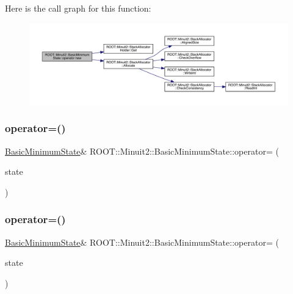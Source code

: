 Here is the call graph for this function\+:
\nopagebreak
\begin{figure}[H]
\begin{center}
\leavevmode
\includegraphics[width=350pt]{d0/db1/classROOT_1_1Minuit2_1_1BasicMinimumState_ad0e5ab496757c5bee3544485a49fe7aa_cgraph}
\end{center}
\end{figure}
\mbox{\label{classROOT_1_1Minuit2_1_1BasicMinimumState_a68cf1c28f5f728fa62a0c39ff943a2bf}} 
\subsubsection{\texorpdfstring{operator=()}{operator=()}\hspace{0.1cm}{\footnotesize\ttfamily [1/3]}}
{\footnotesize\ttfamily \mbox{\hyperlink{classROOT_1_1Minuit2_1_1BasicMinimumState}{Basic\+Minimum\+State}}\& R\+O\+O\+T\+::\+Minuit2\+::\+Basic\+Minimum\+State\+::operator= (\begin{DoxyParamCaption}\item[{const \mbox{\hyperlink{classROOT_1_1Minuit2_1_1BasicMinimumState}{Basic\+Minimum\+State}} \&}]{state }\end{DoxyParamCaption})\hspace{0.3cm}{\ttfamily [inline]}}

\mbox{\label{classROOT_1_1Minuit2_1_1BasicMinimumState_a68cf1c28f5f728fa62a0c39ff943a2bf}} 
\subsubsection{\texorpdfstring{operator=()}{operator=()}\hspace{0.1cm}{\footnotesize\ttfamily [2/3]}}
{\footnotesize\ttfamily \mbox{\hyperlink{classROOT_1_1Minuit2_1_1BasicMinimumState}{Basic\+Minimum\+State}}\& R\+O\+O\+T\+::\+Minuit2\+::\+Basic\+Minimum\+State\+::operator= (\begin{DoxyParamCaption}\item[{const \mbox{\hyperlink{classROOT_1_1Minuit2_1_1BasicMinimumState}{Basic\+Minimum\+State}} \&}]{state }\end{DoxyParamCaption})\hspace{0.3cm}{\ttfamily [inline]}}

